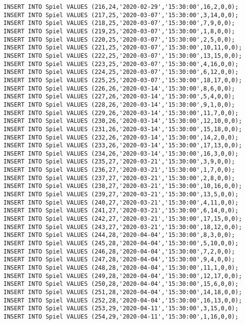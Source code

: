 \documentclass{bschlangaul-aufgabe}
\begin{document}
\begin{verbatim}
INSERT INTO Spiel VALUES (216,24,'2020-02-29','15:30:00',16,2,0,0);
INSERT INTO Spiel VALUES (217,25,'2020-03-07','15:30:00',3,14,0,0);
INSERT INTO Spiel VALUES (218,25,'2020-03-07','15:30:00',7,9,0,0);
INSERT INTO Spiel VALUES (219,25,'2020-03-07','15:30:00',1,8,0,0);
INSERT INTO Spiel VALUES (220,25,'2020-03-07','15:30:00',2,5,0,0);
INSERT INTO Spiel VALUES (221,25,'2020-03-07','15:30:00',10,11,0,0);
INSERT INTO Spiel VALUES (222,25,'2020-03-07','15:30:00',13,15,0,0);
INSERT INTO Spiel VALUES (223,25,'2020-03-07','15:30:00',4,16,0,0);
INSERT INTO Spiel VALUES (224,25,'2020-03-07','15:30:00',6,12,0,0);
INSERT INTO Spiel VALUES (225,25,'2020-03-07','15:30:00',18,17,0,0);
INSERT INTO Spiel VALUES (226,26,'2020-03-14','15:30:00',8,6,0,0);
INSERT INTO Spiel VALUES (227,26,'2020-03-14','15:30:00',5,4,0,0);
INSERT INTO Spiel VALUES (228,26,'2020-03-14','15:30:00',9,1,0,0);
INSERT INTO Spiel VALUES (229,26,'2020-03-14','15:30:00',11,7,0,0);
INSERT INTO Spiel VALUES (230,26,'2020-03-14','15:30:00',12,10,0,0);
INSERT INTO Spiel VALUES (231,26,'2020-03-14','15:30:00',15,18,0,0);
INSERT INTO Spiel VALUES (232,26,'2020-03-14','15:30:00',14,2,0,0);
INSERT INTO Spiel VALUES (233,26,'2020-03-14','15:30:00',17,13,0,0);
INSERT INTO Spiel VALUES (234,26,'2020-03-14','15:30:00',16,3,0,0);
INSERT INTO Spiel VALUES (235,27,'2020-03-21','15:30:00',3,9,0,0);
INSERT INTO Spiel VALUES (236,27,'2020-03-21','15:30:00',1,7,0,0);
INSERT INTO Spiel VALUES (237,27,'2020-03-21','15:30:00',2,8,0,0);
INSERT INTO Spiel VALUES (238,27,'2020-03-21','15:30:00',10,16,0,0);
INSERT INTO Spiel VALUES (239,27,'2020-03-21','15:30:00',13,5,0,0);
INSERT INTO Spiel VALUES (240,27,'2020-03-21','15:30:00',4,11,0,0);
INSERT INTO Spiel VALUES (241,27,'2020-03-21','15:30:00',6,14,0,0);
INSERT INTO Spiel VALUES (242,27,'2020-03-21','15:30:00',17,15,0,0);
INSERT INTO Spiel VALUES (243,27,'2020-03-21','15:30:00',18,12,0,0);
INSERT INTO Spiel VALUES (244,28,'2020-04-04','15:30:00',8,3,0,0);
INSERT INTO Spiel VALUES (245,28,'2020-04-04','15:30:00',5,10,0,0);
INSERT INTO Spiel VALUES (246,28,'2020-04-04','15:30:00',7,2,0,0);
INSERT INTO Spiel VALUES (247,28,'2020-04-04','15:30:00',9,4,0,0);
INSERT INTO Spiel VALUES (248,28,'2020-04-04','15:30:00',11,1,0,0);
INSERT INTO Spiel VALUES (249,28,'2020-04-04','15:30:00',12,17,0,0);
INSERT INTO Spiel VALUES (250,28,'2020-04-04','15:30:00',15,6,0,0);
INSERT INTO Spiel VALUES (251,28,'2020-04-04','15:30:00',14,18,0,0);
INSERT INTO Spiel VALUES (252,28,'2020-04-04','15:30:00',16,13,0,0);
INSERT INTO Spiel VALUES (253,29,'2020-04-11','15:30:00',3,15,0,0);
INSERT INTO Spiel VALUES (254,29,'2020-04-11','15:30:00',1,16,0,0);

\end{verbatim}
\end{document}
